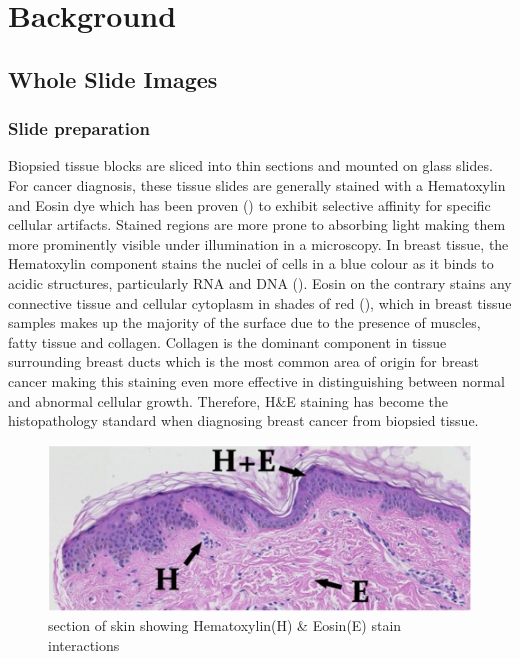 \documentclass{l4proj}
\begin{document}
\chapter{Background}

\section{Whole Slide Images}
\subsection{Slide preparation}
Biopsied tissue blocks are sliced into thin sections and mounted on glass slides. For cancer diagnosis, these tissue slides are generally stained with a Hematoxylin and Eosin dye which has been proven (\textit{\cite{Bancroft2013}}) to exhibit selective affinity for specific cellular artifacts. Stained regions are more prone to absorbing light making them more prominently visible under illumination in a microscopy. In breast tissue, the Hematoxylin component stains the nuclei of cells in a blue colour as it binds to acidic structures, particularly RNA and DNA (\textit{\cite{chan2014wonderful}}). Eosin on the contrary stains any connective tissue and cellular cytoplasm in shades of red (\textit{\cite{Bancroft2013}}), which in breast tissue samples makes up the majority of the surface due to the presence of muscles, fatty tissue and collagen. Collagen is the dominant component in tissue surrounding breast ducts which is the most common area of origin for breast cancer making this staining even more effective in distinguishing between normal and abnormal cellular growth. Therefore, H\&E staining has become the histopathology standard when diagnosing breast cancer from biopsied tissue.

\begin{figure}[h]
\centering
\includegraphics[scale=1.2]{images/HE-stain-example.jpg}
\caption{section of skin showing Hematoxylin(H) \& Eosin(E) stain interactions}
\label{fig:HE-fig}
\end{figure}
\end{document}
